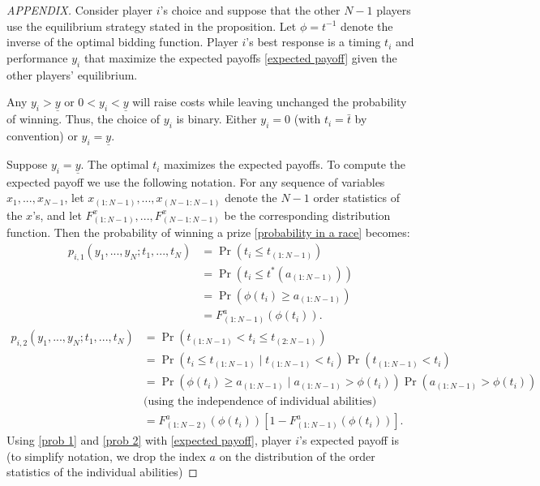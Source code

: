 \documentclass[12pt,]{article}
\theoremstyle{plain} %
\newcommand\deadline{\bar{t}}
\newcommand\target{\underline{y}}
\begin{document}
\begin{shaded}
\begin{proof}[APPENDIX]
Consider player $i$'s choice and suppose that the other $N-1$ players use the equilibrium strategy stated in the proposition. Let $\phi=t^{-1}$ denote the inverse of the optimal bidding function. Player $i$'s best response is a timing $t_i$ and performance $y_i$ that maximize the expected payoffs \eqref{expected payoff} given the other players' equilibrium. 

Any $y_i > \target$ or $0<y_i<\target$ will raise costs while leaving unchanged the probability of winning. Thus, the choice of $y_i$ is binary. Either $y_i=0$ (with $t_i=\deadline$ by convention) or $y_i= \target$.

Suppose $y_i=\target$. The optimal $t_i$ maximizes the expected payoffs. To compute the expected payoff we use the following notation. For any sequence of variables $x_1, ..., x_{N-1}$,  let $x_{(1:N-1)}, ..., x_{(N-1:N-1)}$ denote the $N-1$ order statistics of the $x$'s, and let $F^x_{(1:N-1)}, ..., F^x_{(N-1:N-1)}$ be the corresponding distribution function. Then the probability of winning a prize \eqref{probability in a race} becomes:
\begin{align} \label{prob 1}
  p_{i, 1}(y_1,..., y_N; t_1,..., t_N)
    & = \Pr(t_i \leq t_{(1:N-1)}) \nonumber\\
    & = \Pr(t_i \leq t^*(a_{(1:N-1)})) \nonumber\\
    & = \Pr(\phi(t_i) \geq a_{(1:N-1)}) \nonumber\\
    & = F^a_{(1:N-1)}(\phi(t_i)).
\end{align}
\begin{align} \label{prob 2}
  p_{i, 2}(y_1,..., y_N; t_1,..., t_N) 
    & = \Pr(t_{(1:N-1)} < t_i \leq t_{(2:N-1)})  \nonumber\\
    & = \Pr(t_i\leq t_{(1:N-1)}\mid t_{(1:N-1)}<t_i) \Pr(t_{(1:N-1)} < t_i) \nonumber\\
    & = \Pr(\phi(t_i)\geq a_{(1:N-1)} \mid a_{(1:N-1)} > \phi(t_i)) \Pr(a_{(1:N-1)} > \phi(t_i)) \nonumber\\
    & \text{(using the independence of individual abilities)}\nonumber\\
    & = F^a_{(1:N-2)}(\phi(t_i))\left[1 - F^a_{(1:N-1)}(\phi(t_i))\right].
\end{align}
Using \eqref{prob 1} and \eqref{prob 2} with \eqref{expected payoff}, player $i$'s expected payoff is (to simplify notation, we drop the index $a$ on the distribution of the order statistics of the individual abilities)

\end{proof}
\end{shaded}
\end{document}
